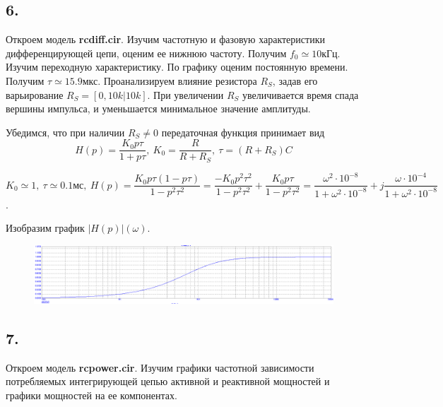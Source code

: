 \documentclass[a4paper, 12pt, twoside]{article}
\begin{document}
\subsection*{6.}

Откроем модель \textbf{rcdiff.cir}. Изучим частотную и фазовую характеристики дифференцирующей цепи, оценим ее нижнюю частоту. Получим $f_0 \simeq 10$кГц. Изучим переходную характеристику. По графику оценим постоянную времени. Получим $\tau \simeq 15.9$мкс. Проанализируем влияние резистора $R_S$, задав его варьирование $R_S = [0,10k|10k].$ При увеличении $R_S$ увеличивается время спада вершины импульса, и уменьшается минимальное значение амплитуды.

Убедимся, что при наличии $R_S \neq 0$ передаточная функция принимает вид $$H(p) = \dfrac{K_0 p \tau}{1+p\tau},~ K_0 = \dfrac{R}{R+R_S},~ \tau =(R+R_S)C$$

$$K_0 \simeq 1, ~ \tau \simeq 0.1\text{мс}, ~ H(p) = \dfrac{K_0 p\tau (1-p\tau)}{1-p^2\tau^2} = \dfrac{-K_0 p^2\tau ^2}{1-p^2\tau^2} + \dfrac{K_0 p\tau}{1-p^2\tau^2} = \dfrac{\omega^2\cdot 10^{-8}}{1+\omega^2\cdot 10^{-8}} + j\dfrac{\omega \cdot 10^{-4}}{1+\omega^2\cdot 10^{-8}}$$.

Изобразим график $|H(p)|(\omega)$.

\begin{figure}[H]
	\centering
	\includegraphics[width = 1\textwidth]{H(p)diff}
	
\end{figure}


\subsection*{7.}


Откроем модель \textbf{rcpower.cir}. Изучим графики частотной зависимости потребляемых интегрирующей цепью активной и реактивной мощностей и графики мощностей на ее компонентах. 
\end{document}
